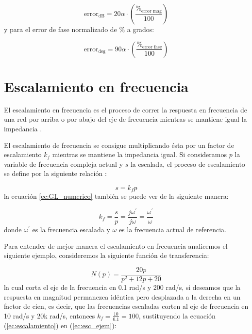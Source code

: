 	\begin{equation}
	\mathrm{error}_{\mathrm{dB}} =  20 \alpha \cdot \left( \frac{\%_{\mathrm{error\,\,mag}}}{100} \right)
	\end{equation}
	y para el error de fase normalizado de \% a grados:
	
	\begin{equation}
	\mathrm{error}_{\mathrm{deg}} = 90 \alpha \cdot \left( \frac{\%_{\mathrm{error\,\,fase}}}{100} \right) 
	\end{equation}
	                                                                 
	\section{Escalamiento en frecuencia}
	
	El escalamiento en frecuencia es el proceso de correr la respuesta en frecuencia de una red por arriba o por abajo del eje de frecuencia mientras  se mantiene igual la impedancia \cite{CharlesAlexander2016}.
	
	El escalamiento de frecuencia se consigue multiplicando ésta por un factor de escalamiento $k_{f}$ mientras se mantiene la impedancia igual. Si consideramos $p$ la variable de frecuencia compleja actual y $s$ la escalada, el proceso de escalamiento se define por la siguiente relación \cite{Allen1980}:
	
	\begin{equation}
	s = k_{f} p
	\label{ec:escalamiento}
	\end{equation}
	la ecuación \ref{ec:GL_numerico} también se puede ver de la siguiente manera:
	
	\begin{equation}
	k_{f} = \frac{s}{p} = \frac{j \omega^{'}}{j \omega} = \frac{\omega^{'}}{\omega}
	\end{equation}
	donde $\omega^{'}$ es la frecuencia escalada y $\omega$ es la frecuencia actual de referencia.
	
	Para entender de mejor manera el escalamiento en frecuencia analicemos el siguiente ejemplo, consideremos la siguiente función de transferencia:
	
	\begin{equation}
	N(p) = \frac{20p}{p^{2} + 12p + 20}
	\label{ec:esc_ejem}
	\end{equation}
	la cual corta el eje de la frecuencia en 0.1 rad/s y 200 rad/s, si deseamos que la respuesta en magnitud permanezca idéntica pero desplazada a la derecha en un factor de cien, es decir, que las frecuencias escaladas corten al eje de frecuencia en 10 rad/s y 20k rad/s, entonces $k_{f} = \frac{10}{0.1} = 100$, sustituyendo la ecuación (\ref{ec:escalamiento}) en (\ref{ec:esc_ejem}):

